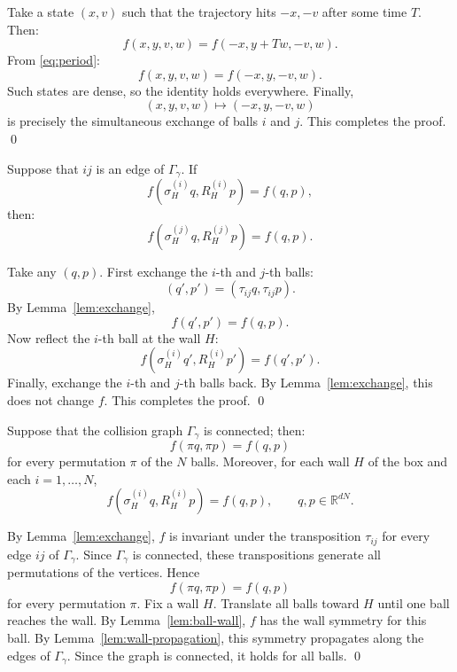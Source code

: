 \documentclass[12pt,reqno]{amsart}
\makeatletter
\renewenvironment{proof}[1][\proofname]{%
  \par\vspace{\topsep}%
  \normalfont\topsep6\p@\@plus6\p@\relax
  \trivlist
  \item[\hskip\labelsep\itshape #1\@addpunct{.}]\ignorespaces
}{%
  \endtrivlist
}
\numberwithin{equation}{section}
\def \R {\mathbb{R}}
\makeatother
\begin{document}
\begin{proof}
Take a state \((x,v)\) such that the 
trajectory hits \(-x, -v\) after 
some time \(T\). Then:
\[
f(x,y,v,w) = f(-x,y + T w,-v,w).
\]
From \eqref{eq:period}: 
\[
f(x,y,v,w) = f(-x,y,-v,w).
\]
Such states are dense, so the identity holds everywhere. Finally,
\[
(x,y,v,w)\longmapsto(-x,y,-v,w)
\]
is precisely the simultaneous exchange of balls \(i\) and \(j\). This completes the proof. \qed
\end{proof}

\begin{lemma}\label{lem:wall-propagation}
Suppose that \(ij\) is an edge of \(\Gamma_\gamma\). If
\[
f(\sigma_H^{(i)}q,R_H^{(i)}p)=f(q,p),
\]
then:
\[
f(\sigma_H^{(j)}q,R_H^{(j)}p)=f(q,p).
\]
\end{lemma}
\begin{proof}
Take any \((q,p)\). First 
exchange the \(i\)-th and \(j\)-th balls:
\[
(q', p')
=
(\tau_{ij}q,\tau_{ij}p).
\]
By Lemma~\ref{lem:exchange},
\[
f(q', p')=f(q,p).
\]
Now reflect the \(i\)-th ball at the wall \(H\):
\[
f(\sigma_H^{(i)} q',
  R_H^{(i)} p')
=
f(q', p').
\]
Finally, exchange the \(i\)-th and \(j\)-th balls back. By
Lemma~\ref{lem:exchange}, this does not change \(f\). This completes the proof. \qed
\end{proof}

\begin{lemma}\label{thm:global}
Suppose that the collision graph \(\Gamma_\gamma\) is connected; then:
\[
f(\pi q,\pi p)=f(q,p)
\]
for every permutation \(\pi\) of the \(N\) balls. Moreover, for each wall \(H\) of the box and each \(i=1,\ldots,N\),
\[
f(\sigma_H^{(i)}q,R_H^{(i)}p)=f(q,p),
\qquad q,p\in\R^{dN}.
\]
\end{lemma}
\begin{proof}
By Lemma~\ref{lem:exchange}, \(f\) is invariant under the transposition
\(\tau_{ij}\) for every edge \(ij\) of \(\Gamma_\gamma\). Since
\(\Gamma_\gamma\) is connected, these transpositions generate all
permutations of the vertices. Hence
\[
f(\pi q,\pi p)=f(q,p)
\]
for every permutation \(\pi\). Fix a wall \(H\). Translate 
all balls toward \(H\) until one 
ball reaches the wall. By Lemma~\ref{lem:ball-wall}, \(f\) has
the wall symmetry for this ball. By Lemma~\ref{lem:wall-propagation}, this symmetry propagates along the
edges of \(\Gamma_\gamma\). Since the graph is connected, it holds for
all balls. \qed
\end{proof}
\end{document}
